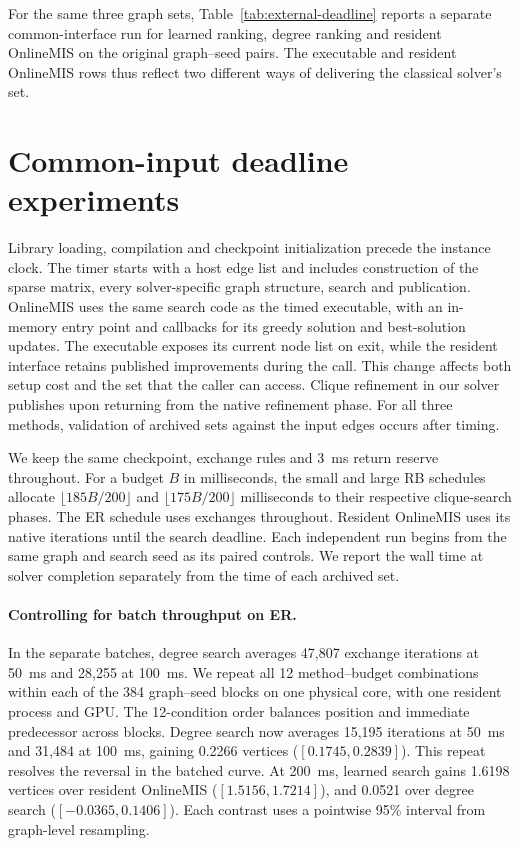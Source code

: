 For the same three graph sets, Table~\ref{tab:external-deadline} reports a separate common-interface run for learned ranking, degree ranking and resident OnlineMIS on the original graph--seed pairs. The executable and resident OnlineMIS rows thus reflect two different ways of delivering the classical solver's set.

\section{Common-input deadline experiments}
\label{app:resident}


Library loading, compilation and checkpoint initialization precede the instance clock. The timer starts with a host edge list and includes construction of the sparse matrix, every solver-specific graph structure, search and publication. OnlineMIS uses the same search code as the timed executable, with an in-memory entry point and callbacks for its greedy solution and best-solution updates. The executable exposes its current node list on exit, while the resident interface retains published improvements during the call. This change affects both setup cost and the set that the caller can access. Clique refinement in our solver publishes upon returning from the native refinement phase. For all three methods, validation of archived sets against the input edges occurs after timing.

We keep the same checkpoint, exchange rules and 3~ms return reserve throughout. For a budget \(B\) in milliseconds, the small and large RB schedules allocate \(\lfloor185B/200\rfloor\) and \(\lfloor175B/200\rfloor\) milliseconds to their respective clique-search phases. The ER schedule uses exchanges throughout. Resident OnlineMIS uses its native iterations until the search deadline. Each independent run begins from the same graph and search seed as its paired controls. We report the wall time at solver completion separately from the time of each archived set.

\paragraph{Controlling for batch throughput on ER.}
In the separate batches, degree search averages 47,807 exchange iterations at 50~ms and 28,255 at 100~ms. We repeat all 12 method--budget combinations within each of the 384 graph--seed blocks on one physical core, with one resident process and GPU. The 12-condition order balances position and immediate predecessor across blocks. Degree search now averages 15,195 iterations at 50~ms and 31,484 at 100~ms, gaining 0.2266 vertices ($[0.1745,0.2839]$). This repeat resolves the reversal in the batched curve. At 200~ms, learned search gains 1.6198 vertices over resident OnlineMIS ($[1.5156,1.7214]$), and 0.0521 over degree search ($[-0.0365,0.1406]$). Each contrast uses a pointwise 95\% interval from graph-level resampling.

